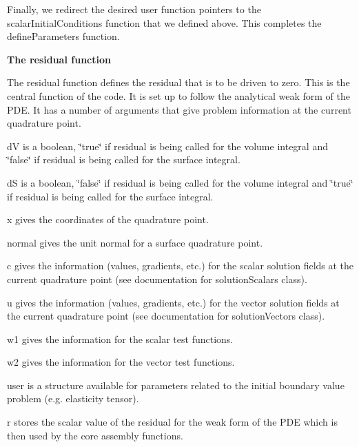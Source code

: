 Finally, we redirect the desired user function pointers to the {\ttfamily scalar\-Initial\-Conditions} function that we defined above. This completes the {\ttfamily define\-Parameters} function.


\begin{DoxyCodeInclude}

\end{DoxyCodeInclude}


{\bfseries  The {\ttfamily residual} function }

The residual function defines the residual that is to be driven to zero. This is the central function of the code. It is set up to follow the analytical weak form of the P\-D\-E. It has a number of arguments that give problem information at the current quadrature point.


\begin{DoxyCodeInclude}

\end{DoxyCodeInclude}


{\ttfamily d\-V} is a boolean, \char`\"{}true\char`\"{} if {\ttfamily residual} is being called for the volume integral and \char`\"{}false\char`\"{} if {\ttfamily residual} is being called for the surface integral.\par
{\ttfamily d\-S} is a boolean, \char`\"{}false\char`\"{} if {\ttfamily residual} is being called for the volume integral and \char`\"{}true\char`\"{} if {\ttfamily residual} is being called for the surface integral.\par
{\ttfamily x} gives the coordinates of the quadrature point.\par
{\ttfamily normal} gives the unit normal for a surface quadrature point.\par
{\ttfamily c} gives the information (values, gradients, etc.) for the scalar solution fields at the current quadrature point (see documentation for solution\-Scalars class).\par
{\ttfamily u} gives the information (values, gradients, etc.) for the vector solution fields at the current quadrature point (see documentation for solution\-Vectors class).\par
{\ttfamily w1} gives the information for the scalar test functions.\par
{\ttfamily w2} gives the information for the vector test functions.\par
{\ttfamily user} is a structure available for parameters related to the initial boundary value problem (e.\-g. elasticity tensor).\par
{\ttfamily r} stores the scalar value of the residual for the weak form of the P\-D\-E which is then used by the core assembly functions.

